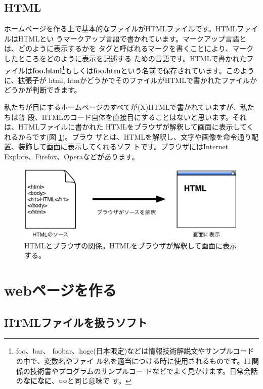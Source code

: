 \documentclass[12pt, a4j]{jsarticle}
\newcommand{\figref}[1]{図 \ref{#1}}
\begin{document}
\subsection{HTML}
ホームページを作る上で基本的なファイルがHTMLファイルです。HTMLファイルはHTMLとい
うマークアップ言語で書かれています。マークアップ言語とは、どのように表示するかを
タグと呼ばれるマークを書くことにより、マークしたところをどのように表示を記述する
ための言語です。HTMLで書かれたファイルは{\bf \sf foo.html}\footnote{foo、bar、
foobar、hoge(日本限定)などは情報技術解説文やサンプルコードの中で、変数名やファイ
ル名を適当につける時に使用されるものです。IT関係の技術書やプログラムのサンプルコー
ドなどでよく見かけます。日常会話の{\bf \sf なになに}、{\bf \sf ○○}と同じ意味で
す。}もしくは{\bf \sf foo.htm}という名前で保存されています。このように、拡張子が
html, htmかどうかでそのファイルがHTMLで書かれたファイルかどうかが判断できます。

私たちが目にするホームページのすべてが(X)HTMLで書かれていますが、私たちは普
段、HTMLのコード自体を直接目にすることはないと思います。それは、HTMLファイルに書かれた
HTMLをブラウザが解釈して画面に表示してくれるからです(\figref{fig:schime})。ブラウ
ザとは、HTMLを解釈し、文字や画像を命令通り配置、装飾して画面に表示してくれるソフ
トです。ブラウザにはInternet Explore、Firefox、Operaなどがあります。

\begin{figure}[htbp]
\begin{center}
\includegraphics[width=0.8\linewidth]{img.eps}
\caption{HTMLとブラウザの関係。HTMLをブラウザが解釈して画面に表示する。}
\label{fig:schime}
\end{center}
\end{figure}


\section{webページを作る}

\subsection{HTMLファイルを扱うソフト}
\end{document}
